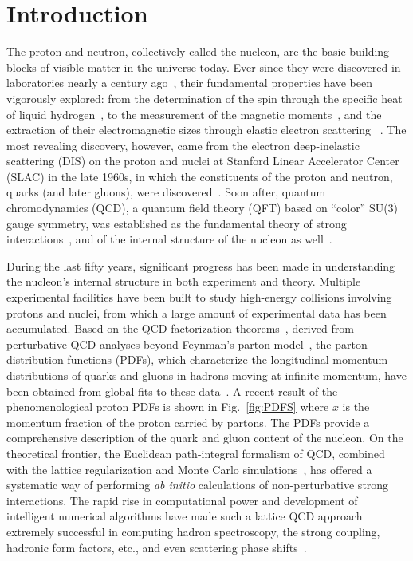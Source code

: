 \documentclass[aps,rmp,reprint,amsmath,amssymb,graphicx,longbibliography]{revtex4-1} %
\begin{document}
\section{Introduction}
\label{sec:intro}
The proton and neutron, collectively called the nucleon, are the basic
building blocks of visible matter in the universe today. Ever since they were
discovered in laboratories nearly a century ago~\cite{Rutherford:1919fnt,Chadwick:1932ma}, their fundamental
properties have been vigorously explored:
from the determination of the spin through the specific heat of liquid hydrogen~\cite{Dennison},
to the measurement of the magnetic moments~\cite{Stern}, and the extraction of their electromagnetic sizes through elastic electron scattering
~\cite{Hofstadter:1956qs}. The most revealing discovery, however, came from the
electron deep-inelastic scattering (DIS) on the proton and nuclei at Stanford Linear Accelerator
Center (SLAC) in the late 1960s, in which the constituents of the
proton and neutron, quarks (and later gluons), were discovered~\cite{Bloom:1969kc}.
Soon after, quantum chromodynamics (QCD), a
quantum field theory (QFT) based on ``color'' SU(3) gauge symmetry,
was established as the fundamental theory of strong interactions~\cite{Fritzsch:1973pi,Gross:1973id,Politzer:1973fx},
and of the internal structure of the nucleon as well~\cite{Thomas:2001kw}.

During the last fifty years, significant progress has been made
in understanding the nucleon's internal structure in both experiment and theory.
Multiple experimental facilities have been built to study
high-energy collisions involving protons and nuclei, from which
a large amount of experimental data has been accumulated.
Based on the QCD factorization theorems~\cite{Collins:2011zzd}, derived from perturbative QCD
analyses beyond Feynman's parton model~\cite{Feynman:1973xc},
the parton distribution functions (PDFs), which characterize the
longitudinal momentum distributions of quarks and gluons in hadrons moving at
infinite momentum, have been obtained from global fits
to these data~\cite{Gao:2017yyd, Hou:2019efy, Harland-Lang:2014zoa, Ball:2017nwa}. A recent
result of the phenomenological proton PDFs is shown in Fig.~\ref{fig:PDFS} where $x$
is the momentum fraction of the proton carried by partons.
The PDFs provide a comprehensive
description of the quark and gluon content of the nucleon.
On the theoretical frontier, the Euclidean path-integral formalism of QCD, combined with the lattice
regularization and Monte Carlo simulations~\cite{Wilson:1974sk}, has
offered a systematic way of performing {\it ab initio} calculations of non-perturbative strong interactions.
The rapid rise in computational power and development of intelligent numerical
algorithms have made such a lattice QCD approach extremely successful in computing hadron
spectroscopy, the strong coupling, hadronic form factors,
etc., and even scattering phase shifts~\cite{Tanabashi:2018oca,Briceno:2017max,Aoki:2019cca}.
\end{document}
